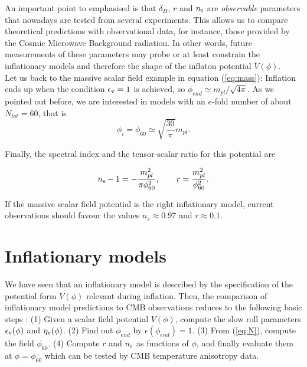 \documentclass{rmaa}
\def\beq{\begin{equation}}
\def\eeq{\end{equation}}
\begin{document}
An important point to emphasised is that  $\delta_H$, $r$ and $n_{\rm s}$ are {\em observable} 
parameters that nowadays are tested from several experiments. 
This allows us to compare theoretical predictions with observational data,  
for instance, those provided by the Cosmic Microwave Background radiation. 
In other words, future measurements of these parameters may
probe or at least constrain the inflationary models and therefore the shape of the inflaton potential $V(\phi)$.
\\

Let us back to the massive scalar field example in equation  (\ref{eq:mass}):
%
Inflation ends up when the condition $\epsilon_{\rm v}=1$ is achieved, so $\phi_{end}\simeq m_{pl}/\sqrt{4 \pi}$.
 As we pointed out before, we are interested in models with an $e$-fold number of about $N_{tot}=60$, that is
 \beq
 \phi_i=\phi_{60}\simeq \sqrt{\frac{30}{\pi}}m_{pl}.
 \eeq
 
 \noindent
 Finally, the spectral index and the tensor-scalar ratio for this potential are
 
 \beq
 n_{\rm s}-1= -\frac{m_{pl}^2}{\pi \phi_{60}^2}, \qquad r= \frac{m_{pl}^2}{\phi_{60}^2}.
 \eeq

\noindent
If the massive scalar field potential is the right inflationary model, current observations should favour
the values $n_s\approx 0.97$ and $r\approx 0.1$.
\\



\section{Inflationary models}


We have seen that an inflationary model is described by the specification of the 
potential form $V(\phi)$ relevant during inflation. Then, the comparison of inflationary 
model predictions to CMB observations reduces to the following basic steps \citep{Kinney}:
 (1) Given a scalar field potential $V(\phi)$, compute the slow roll parameters $\epsilon_{\rm v}(\phi)$ and
$\eta_{\rm v}(\phi)$. 
(2) Find out $\phi_{end}$ by $\epsilon(\phi_{end})=1$. 
(3) From (\ref{eq:N}), compute the field $\phi_{60}$.
(4)  Compute $r$ and $n_{\rm s}$ as functions of $\phi$, and finally evaluate them at $\phi =
\phi_{60}$ which can be tested by CMB temperature anisotropy data. 
\\
\end{document}
